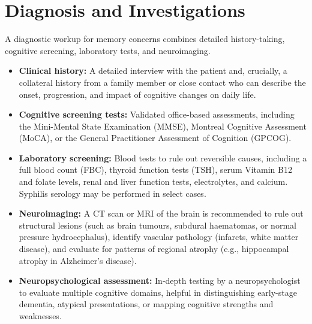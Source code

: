\section*{Diagnosis and Investigations}
A diagnostic workup for memory concerns combines detailed history-taking, cognitive screening, laboratory tests, and neuroimaging.
\begin{itemize}
    \item \textbf{Clinical history:} A detailed interview with the patient and, crucially, a collateral history from a family member or close contact who can describe the onset, progression, and impact of cognitive changes on daily life.
    \item \textbf{Cognitive screening tests:} Validated office-based assessments, including the Mini-Mental State Examination (MMSE), Montreal Cognitive Assessment (MoCA), or the General Practitioner Assessment of Cognition (GPCOG).
    \item \textbf{Laboratory screening:} Blood tests to rule out reversible causes, including a full blood count (FBC), thyroid function tests (TSH), serum Vitamin B12 and folate levels, renal and liver function tests, electrolytes, and calcium. Syphilis serology may be performed in select cases.
    \item \textbf{Neuroimaging:} A CT scan or MRI of the brain is recommended to rule out structural lesions (such as brain tumours, subdural haematomas, or normal pressure hydrocephalus), identify vascular pathology (infarcts, white matter disease), and evaluate for patterns of regional atrophy (e.g., hippocampal atrophy in Alzheimer's disease).
    \item \textbf{Neuropsychological assessment:} In-depth testing by a neuropsychologist to evaluate multiple cognitive domains, helpful in distinguishing early-stage dementia, atypical presentations, or mapping cognitive strengths and weaknesses.
\end{itemize}

